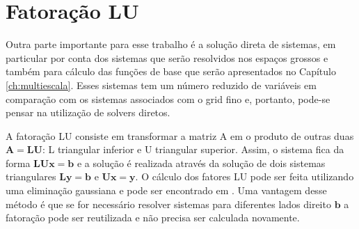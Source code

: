 \section{Fatoração LU} \label{sec:fatoracaolu}

Outra parte importante para esse trabalho é a solução direta de sistemas, em particular por conta dos sistemas que serão resolvidos nos espaços grossos e também para cálculo das funções de base que serão apresentados no Capítulo \ref{ch:multiescala}. Esses sistemas tem um número reduzido de variáveis em comparação com os sistemas associados com o grid fino e, portanto, pode-se pensar na utilização de solvers diretos.

A fatoração LU consiste em transformar a matriz A em o produto de outras duas $\mathbf{A}=\mathbf{L}\mathbf{U}$: L triangular inferior e U triangular superior. Assim, o sistema fica da forma $\mathbf{L} \mathbf{U} \mathbf{x} = \mathbf{b}$ e a solução é realizada através da solução de dois sistemas triangulares $\mathbf{L}\mathbf{y} = \mathbf{b}$ e $\mathbf{U}\mathbf{x} = \mathbf{y}$. O cálculo dos fatores LU pode ser feita utilizando uma eliminação gaussiana e pode ser encontrado em   \citet{heath1997scientific}. Uma vantagem desse método é que se for necessário resolver sistemas para diferentes lados direito $\mathbf{b}$ a fatoração pode ser reutilizada e não precisa ser calculada novamente. %